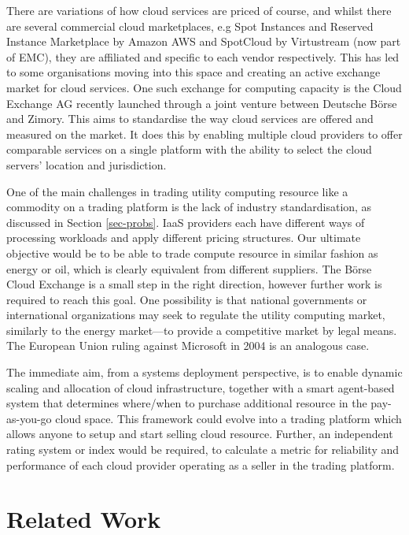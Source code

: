 \documentclass[conference,10pt]{IEEEtran}
\begin{document}
There are variations of how cloud services are priced of course, and whilst there are several commercial cloud marketplaces, e.g Spot Instances and Reserved Instance Marketplace by Amazon AWS and SpotCloud by Virtustream (now part of EMC), they are affiliated and specific to each vendor respectively. 
This has led to some organisations moving into this space and creating an active exchange market for cloud services. One such exchange for computing capacity is the Cloud Exchange AG \cite{url7} recently launched through a joint venture between Deutsche B\"{o}rse and Zimory.  This aims to standardise the way cloud services are offered and measured on the market. It does this by enabling multiple cloud providers to offer comparable services on a single platform with the ability to select the cloud servers' location and jurisdiction.

One of the main challenges in trading utility computing resource like a commodity on a trading platform is the lack of industry standardisation, as discussed in Section \ref{sec-probs}.
IaaS providers each have different ways of processing workloads and apply different pricing structures. Our ultimate objective would be to be able to trade compute resource in similar fashion as energy or oil, which is clearly equivalent from different suppliers.
The B\"{o}rse Cloud Exchange is a small step in the right direction, however further work is required to reach this goal. One possibility is that national governments or international organizations may seek to regulate the utility computing market, similarly to the energy market---to provide a competitive market by legal means. The European Union ruling against Microsoft in 2004 is an analogous case.


The immediate aim, from a systems deployment perspective, is to enable
dynamic scaling and allocation of cloud infrastructure, together with a smart agent-based system that determines where/when to purchase  additional resource 
in the pay-as-you-go cloud space. 
This framework could evolve into 
a trading platform which allows anyone to setup and start selling cloud resource. Further, an independent rating system or index would be required, to calculate a metric for reliability and performance of each cloud provider operating as a seller in the trading platform.


\section{Related Work}
\label{sec-relw}
\end{document}
